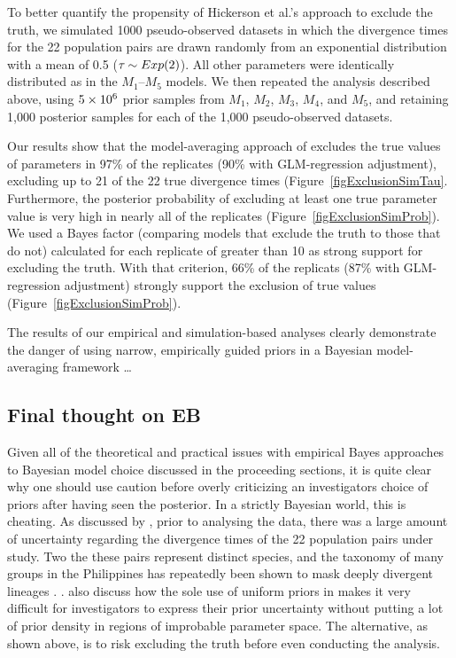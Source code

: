 \documentclass[letterpaper,12pt]{article}
\begin{document}
\begin{linenumbers}
To better quantify the propensity of Hickerson et al.'s
\citeyear{Hickerson2013} approach to exclude the truth, we simulated
1000 pseudo-observed datasets in which the divergence times for the
22 population pairs are drawn randomly from an exponential distribution
with a mean of 0.5 ($\tau_{} \sim Exp(2)$). All other parameters were
identically distributed as in the $M_1$--$M_5$ models.
We then repeated the analysis described above, using $5\times 10^{6}$ prior samples from
$M_1$, $M_2$, $M_3$, $M_4$, and $M_5$, and retaining 1,000 posterior samples
for each of the 1,000 pseudo-observed datasets.

Our results show that the model-averaging approach of \citet{Hickerson2013}
excludes the true values of parameters in 97\% of the replicates (90\% with
GLM-regression adjustment), excluding up to 21 of the 22 true divergence times
(Figure~\ref{figExclusionSimTau}.
Furthermore, the posterior probability of excluding at least one true parameter
value is very high in nearly all of the replicates
(Figure~\ref{figExclusionSimProb}).
We used a Bayes factor (comparing models that exclude the truth to those that
do not) calculated for each replicate of greater than 10 as strong support for
excluding the truth.
With that criterion, 66\% of the replicats (87\% with GLM-regression adjustment)
strongly support the exclusion of true values (Figure~\ref{figExclusionSimProb}).

The results of our empirical and simulation-based analyses clearly demonstrate
the danger of using narrow, empirically guided priors in a Bayesian
model-averaging framework \ldots

\subsection*{Final thought on EB}
Given all of the theoretical and practical issues with empirical Bayes
approaches to Bayesian model choice discussed in the proceeding sections, it is
quite clear why one should use caution before overly criticizing an
investigators choice of priors after having seen the posterior.
In a strictly Bayesian world, this is cheating.
As discussed by \citet{Oaks2012}, prior to analysing the data, there was a large
amount of uncertainty regarding the divergence times of the 22 population pairs
under study.
Two the these pairs represent distinct species, and the taxonomy of many groups
in the Philippines has repeatedly been shown to mask deeply divergent lineages
\citep{RafeDiesmosAlcala2008,Linkem2010,Siler2010,Welton2010,Siler2011HerpMonographs,
Siler2011,Siler2012,RafeStuart2012}.
.
\citet{Oaks2012} also discuss how the sole use of uniform priors in \msb makes
it very difficult for investigators to express their prior uncertainty without
putting a lot of prior density in regions of improbable parameter space.
The alternative, as shown above, is to risk excluding the truth before even
conducting the analysis.







\end{linenumbers}
\end{document}
